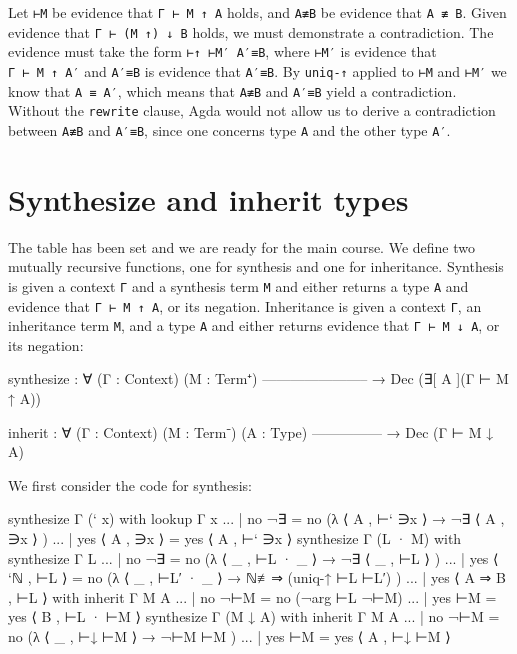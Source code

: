 Let \texttt{⊢M} be evidence that \texttt{Γ\ ⊢\ M\ ↑\ A} holds, and
\texttt{A≢B} be evidence that \texttt{A\ ≢\ B}. Given evidence that
\texttt{Γ\ ⊢\ (M\ ↑)\ ↓\ B} holds, we must demonstrate a contradiction.
The evidence must take the form \texttt{⊢↑\ ⊢M′\ A′≡B}, where
\texttt{⊢M′} is evidence that \texttt{Γ\ ⊢\ M\ ↑\ A′} and \texttt{A′≡B}
is evidence that \texttt{A′≡B}. By \texttt{uniq-↑} applied to
\texttt{⊢M} and \texttt{⊢M′} we know that \texttt{A\ ≡\ A′}, which means
that \texttt{A≢B} and \texttt{A′≡B} yield a contradiction. Without the
\texttt{rewrite} clause, Agda would not allow us to derive a
contradiction between \texttt{A≢B} and \texttt{A′≡B}, since one concerns
type \texttt{A} and the other type \texttt{A′}.

\hypertarget{synthesize-and-inherit-types}{%
\section{Synthesize and inherit
types}\label{synthesize-and-inherit-types}}

The table has been set and we are ready for the main course. We define
two mutually recursive functions, one for synthesis and one for
inheritance. Synthesis is given a context \texttt{Γ} and a synthesis
term \texttt{M} and either returns a type \texttt{A} and evidence that
\texttt{Γ\ ⊢\ M\ ↑\ A}, or its negation. Inheritance is given a context
\texttt{Γ}, an inheritance term \texttt{M}, and a type \texttt{A} and
either returns evidence that \texttt{Γ\ ⊢\ M\ ↓\ A}, or its negation:

\begin{fence}
\begin{code}
synthesize : ∀ (Γ : Context) (M : Term⁺)
    -----------------------
  → Dec (∃[ A ](Γ ⊢ M ↑ A))

inherit : ∀ (Γ : Context) (M : Term⁻) (A : Type)
    ---------------
  → Dec (Γ ⊢ M ↓ A)
\end{code}
\end{fence}

We first consider the code for synthesis:

\begin{fence}
\begin{code}
synthesize Γ (` x) with lookup Γ x
... | no  ¬∃              =  no  (λ{ ⟨ A , ⊢` ∋x ⟩ → ¬∃ ⟨ A , ∋x ⟩ })
... | yes ⟨ A , ∋x ⟩      =  yes ⟨ A , ⊢` ∋x ⟩
synthesize Γ (L · M) with synthesize Γ L
... | no  ¬∃              =  no  (λ{ ⟨ _ , ⊢L  · _  ⟩  →  ¬∃ ⟨ _ , ⊢L ⟩ })
... | yes ⟨ `ℕ ,    ⊢L ⟩  =  no  (λ{ ⟨ _ , ⊢L′ · _  ⟩  →  ℕ≢⇒ (uniq-↑ ⊢L ⊢L′) })
... | yes ⟨ A ⇒ B , ⊢L ⟩ with inherit Γ M A
...    | no  ¬⊢M          =  no  (¬arg ⊢L ¬⊢M)
...    | yes ⊢M           =  yes ⟨ B , ⊢L · ⊢M ⟩
synthesize Γ (M ↓ A) with inherit Γ M A
... | no  ¬⊢M             =  no  (λ{ ⟨ _ , ⊢↓ ⊢M ⟩  →  ¬⊢M ⊢M })
... | yes ⊢M              =  yes ⟨ A , ⊢↓ ⊢M ⟩
\end{code}
\end{fence}

